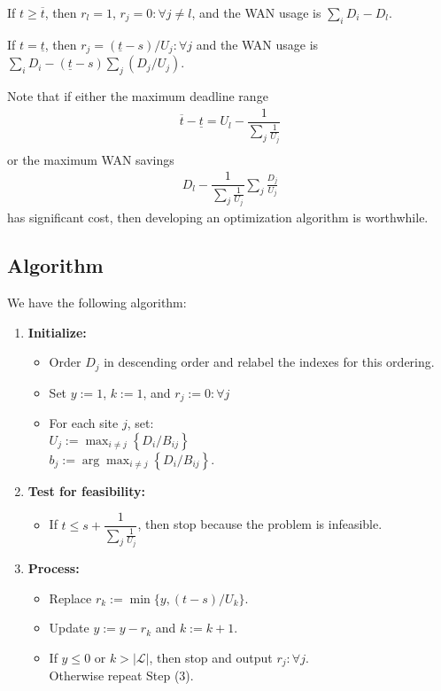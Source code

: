 If $t\geq \overline{t}$, then $r_l=1$, $r_j=0:\forall j\neq l$, and the WAN usage is $\sum_{i}D_i-D_l$.

If $t= \underline{t}$, then $r_j = (\underline{t}-s)/U_j:\forall j$ and the WAN usage is $\sum_{i}D_i-(\underline{t}-s)\sum_{j}(D_j/U_j)$.

Note that if either the maximum deadline range
\begin{align}
	\overline{t}-\underline{t} = U_l - \dfrac{1}{\sum_{j}\frac{1}{U_j}} \\
\end{align}
or the maximum WAN savings
\begin{align}
	D_l-\dfrac{1}{\sum_{j}\frac{1}{U_j}}\sum_{j}\frac{D_j}{U_j}
\end{align}
has significant cost, then developing an optimization algorithm is worthwhile.

\subsection{Algorithm}

We have the following algorithm:
\begin{enumerate}
	\item \textbf{Initialize:}
	\begin{itemize}
		\item Order $D_j$ in descending order and relabel the indexes for this ordering.
		\item Set $y := 1$, $k := 1$, and $r_j := 0:\forall j$
		\item For each site $j$, set:\\
		$U_j := \max_{i\neq j}\left\{D_i/B_{ij}\right\}$\\
		$b_j := \arg\max_{i\neq j}\left\{D_i/B_{ij}\right\}$.
	\end{itemize}
	\item \textbf{Test for feasibility:}
	\begin{itemize}
		\item If $t\leq s+\dfrac{1}{\sum_{j}\frac{1}{U_j}}$, then stop because the problem is infeasible.
	\end{itemize}
	\item \textbf{Process:}
	\begin{itemize}
		\item Replace $r_k := \min\{y,(t-s)/U_k\}$.
		\item Update $y:= y - r_k$ and $k:=k+1$.
		\item If $y \leq 0$ or $k>|\mathcal{L}|$, then stop and output $r_j:\forall j$.\\
		Otherwise repeat Step (3).
	\end{itemize}
\end{enumerate}